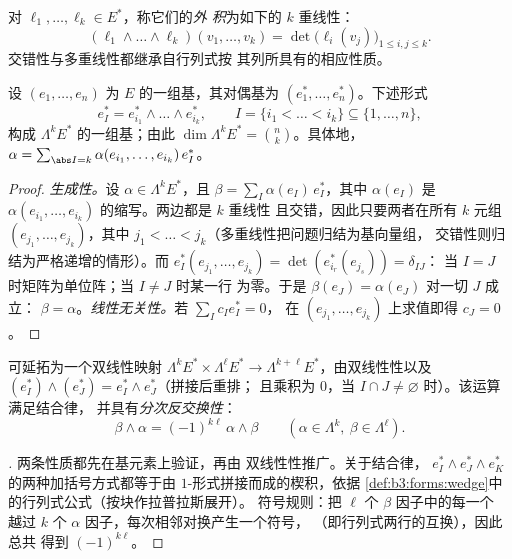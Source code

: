 \begin{definition}\label{def:b3:forms:wedge}
对 $\ell_1, \dots, \ell_k \in E^*$，称它们的\emph{外
积}为如下的 $k$ 重线性：
\[
(\ell_1 \wedge \dots \wedge \ell_k)(v_1, \dots, v_k)
= \det\bigl(\ell_i(v_j)\bigr)_{1 \leq i, j \leq k} .
\]
交错性与多重线性都继承自行列式按
其列所具有的相应性质。
\end{definition}

\begin{proposition}[$\Lambda^k$ 的基]\label{prop:b3:forms:basis}
设 $(e_1, \dots, e_n)$ 为 $E$ 的一组基，其对偶基为
$(e_1^*, \dots, e_n^*)$。下述形式
\[
e_I^* = e_{i_1}^* \wedge \dots \wedge e_{i_k}^*,
\qquad I = \{i_1 < \dots < i_k\} \subseteq \{1, \dots, n\},
\]
构成 $\Lambda^kE^*$ 的一组基；由此 $\dim\Lambda^kE^* =
\binom nk$。具体地，$\alpha =
\sum_{\abs I = k}\alpha(e_{i_1}, \dots, e_{i_k})\,e_I^*$。
\end{proposition}

\begin{proof}
\emph{生成性。}设 $\alpha \in \Lambda^kE^*$，且 $\beta =
\sum_I\alpha(e_I)\,e_I^*$，其中 $\alpha(e_I)$ 是
$\alpha(e_{i_1}, \dots, e_{i_k})$ 的缩写。两边都是 $k$ 重线性
且交错，因此只要两者在所有
$k$ 元组 $(e_{j_1}, \dots, e_{j_k})$，其中 $j_1 < \dots <
j_k$（多重线性把问题归结为基向量组，
交错性则归结为严格递增的情形）。而 $e_I^*(e_{j_1},
\dots, e_{j_k}) = \det(e_{i_r}^*(e_{j_s})) = \delta_{IJ}$：
当 $I = J$ 时矩阵为单位阵；当 $I \neq J$ 时某一行
为零。于是 $\beta(e_J) = \alpha(e_J)$ 对一切 $J$ 成立：
$\beta = \alpha$。\emph{线性无关性。}若 $\sum_I c_Ie_I^* = 0$，
在 $(e_{j_1}, \dots, e_{j_k})$ 上求值即得 $c_J = 0$。
\end{proof}

\begin{definition}\label{def:b3:forms:wedgegeneral}
可延拓为一个双线性映射
$\Lambda^kE^* \times \Lambda^\ell E^* \to
\Lambda^{k+\ell}E^*$，由双线性性以及
$(e_I^*) \wedge (e_J^*) = e_I^* \wedge e_J^*$（拼接后重排；
且乘积为 $0$，当 $I \cap J \neq
\varnothing$ 时）。该运算满足结合律，
并具有\emph{分次反交换性}：
\[
\beta \wedge \alpha = (-1)^{k\ell}\,\alpha \wedge \beta
\qquad (\alpha \in \Lambda^k, \ \beta \in \Lambda^\ell).
\]
\end{definition}

\begin{proof}[\omnameProof]
两条性质都先在基元素上验证，再由
双线性性推广。关于结合律，
$e_I^* \wedge e_J^* \wedge e_K^*$ 的两种加括号方式都等于由
$1$-形式拼接而成的楔积，依据
\cref{def:b3:forms:wedge}中的行列式公式（按块作拉普拉斯展开）。
符号规则：把 $\ell$ 个 $\beta$ 因子中的每一个
越过 $k$ 个 $\alpha$ 因子，每次相邻对换产生一个符号，
（即行列式两行的互换），因此总共
得到 $(-1)^{k\ell}$。
\end{proof}

